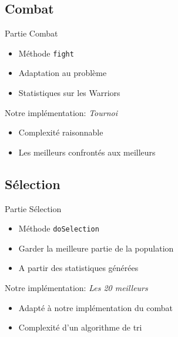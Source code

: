 \documentclass{beamer}
\begin{document}
\subsection{Combat}
\begin{frame}%
\begin{center}
{\Large Partie Combat}
\begin{itemize}
    \item Méthode \texttt{fight}
    \item Adaptation au problème
    \item Statistiques sur les Warriors
\end{itemize}
\vspace{5mm}
\begin{exampleblock}{Notre implémentation: \emph{Tournoi}}
\begin{itemize}
    \item Complexité raisonnable
    \item Les meilleurs confrontés aux meilleurs
\end{itemize}
\end{exampleblock}
\end{center}
\end{frame}

\subsection{Sélection}
\begin{frame}
\begin{center}
{\Large Partie Sélection}
\begin{itemize}
    \item Méthode \texttt{doSelection}
    \item Garder la meilleure partie de la population
    \item A partir des statistiques générées
\end{itemize}
\vspace{5mm}
\begin{exampleblock}{Notre implémentation: \emph{Les 20 meilleurs}}
\begin{itemize}
    \item Adapté à notre implémentation du combat
    \item Complexité d'un algorithme de tri
\end{itemize}
\end{exampleblock}
\end{center}
\end{frame}
\end{document}
